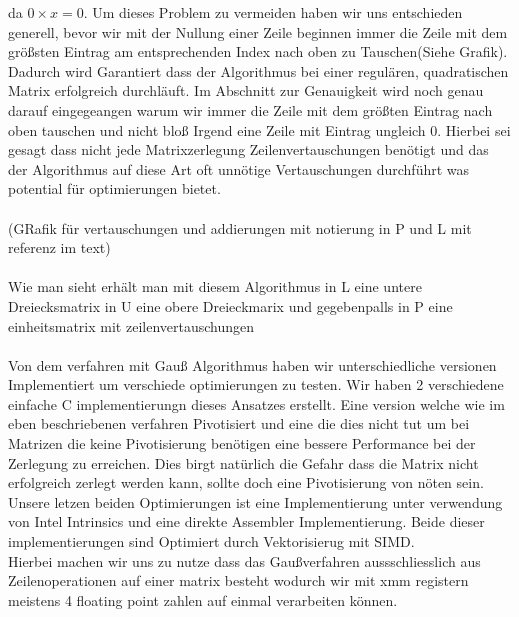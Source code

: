 \documentclass[course=erap]{aspdoc}
\begin{document}
da $ 0 \times x = 0$. Um dieses Problem zu vermeiden haben wir uns entschieden generell, bevor wir mit der Nullung einer Zeile beginnen immer die Zeile mit dem größsten Eintrag
am entsprechenden Index nach oben zu Tauschen(Siehe Grafik). Dadurch wird Garantiert dass der Algorithmus bei einer regulären, quadratischen Matrix erfolgreich durchläuft. Im Abschnitt zur Genauigkeit wird noch genau darauf 
eingegeangen warum wir immer die Zeile mit dem größten Eintrag nach oben tauschen und nicht bloß Irgend eine Zeile mit Eintrag ungleich 0.
Hierbei sei gesagt dass nicht jede Matrixzerlegung Zeilenvertauschungen benötigt und das der Algorithmus auf diese Art oft unnötige Vertauschungen durchführt was potential für 
optimierungen bietet.\\\\
 

 (GRafik für vertauschungen und addierungen mit notierung in P und L mit referenz im text)\\\\
\noindent\hspace*{15mm}%
 Wie man sieht erhält man mit diesem Algorithmus in L eine untere Dreiecksmatrix in U eine obere Dreieckmarix 
 und gegebenpalls in P eine einheitsmatrix mit zeilenvertauschungen\\\\

\noindent\hspace*{15mm}%
Von dem verfahren mit Gauß Algorithmus haben wir unterschiedliche versionen Implementiert um verschiede optimierungen zu testen.
 Wir haben 2 verschiedene einfache C implementierungn dieses Ansatzes erstellt.
Eine version welche wie im eben beschriebenen verfahren Pivotisiert und eine die dies nicht tut um bei Matrizen die keine Pivotisierung benötigen
eine bessere Performance bei der Zerlegung zu erreichen.
Dies birgt natürlich die Gefahr dass die Matrix nicht erfolgreich zerlegt werden kann, sollte doch eine Pivotisierung von nöten sein.\\
  Unsere letzen beiden Optimierungen ist eine Implementierung unter verwendung von Intel Intrinsics und eine direkte Assembler
  Implementierung. Beide dieser implementierungen sind Optimiert durch Vektorisierug mit SIMD.\\
 Hierbei machen wir uns zu nutze dass das Gaußverfahren aussschliesslich aus Zeilenoperationen auf einer matrix besteht wodurch
 wir mit xmm registern meistens 4 floating point zahlen auf einmal verarbeiten können.
  
  
\end{document}
